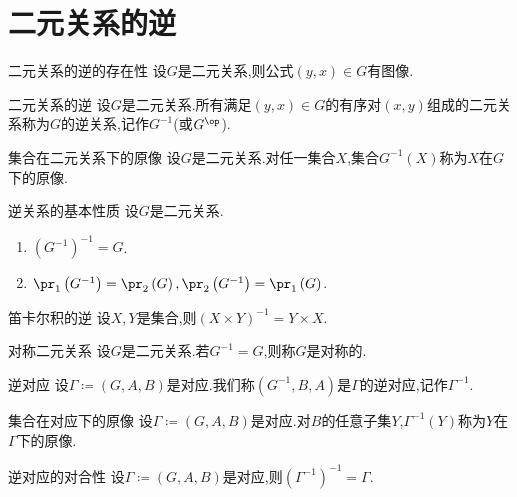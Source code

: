 \section{二元关系的逆}

\begin{lemma}{二元关系的逆的存在性}{}
	设$G$是二元关系,则公式$\left(y,x\right)\in G$有图像.
\end{lemma}

\begin{definition}{二元关系的逆}{}
	设$G$是二元关系.所有满足$\left(y,x\right)\in G$的有序对$\left(x,y\right)$组成的二元关系称为$G$的逆关系,记作$G^{-1}$(或$G^{\op}$).
\end{definition}

\begin{definition}{集合在二元关系下的原像}{}
	设$G$是二元关系.对任一集合$X$,集合$G^{-1}\left(X\right)$称为$X$在$G$下的原像.
\end{definition}

\begin{proposition}{逆关系的基本性质}{}
	设$G$是二元关系.
	\begin{enumerate}
		\item $\left(G^{-1}\right)^{-1}=G$.
		\item $\pr_{1}\left(G^{-1}\right)=\pr_{2}\left(G\right),\pr_{2}\left(G^{-1}\right)=\pr_{1}\left(G\right)$.
	\end{enumerate}
\end{proposition}

\begin{proposition}{笛卡尔积的逆}{}
	设$X,Y$是集合,则$\left(X\times Y\right)^{-1}=Y\times X$.
\end{proposition}

\begin{definition}{对称二元关系}{}
	设$G$是二元关系.若$G^{-1}=G$,则称$G$是对称的.
\end{definition}

\begin{definition}{逆对应}{}
	设$\Gamma\coloneq\left(G,A,B\right)$是对应.我们称$\left(G^{-1},B,A\right)$是$\Gamma$的逆对应,记作$\Gamma^{-1}$.
\end{definition}

\begin{definition}{集合在对应下的原像}{}
	设$\Gamma\coloneq\left(G,A,B\right)$是对应.对$B$的任意子集$Y$,$\Gamma^{-1}\left(Y\right)$称为$Y$在$\Gamma$下的原像.
\end{definition}

\begin{proposition}{逆对应的对合性}{}
	设$\Gamma\coloneq\left(G,A,B\right)$是对应,则$\left(\Gamma^{-1}\right)^{-1}=\Gamma$.
\end{proposition}















